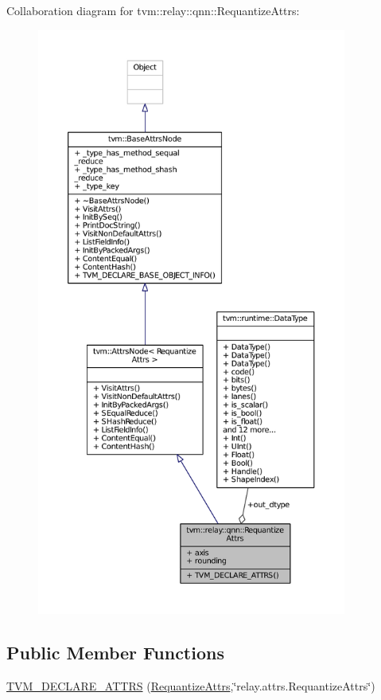 Collaboration diagram for tvm\+:\+:relay\+:\+:qnn\+:\+:Requantize\+Attrs\+:
\nopagebreak
\begin{figure}[H]
\begin{center}
\leavevmode
\includegraphics[height=550pt]{structtvm_1_1relay_1_1qnn_1_1RequantizeAttrs__coll__graph}
\end{center}
\end{figure}
\subsection*{Public Member Functions}
\begin{DoxyCompactItemize}
\item 
\hyperlink{structtvm_1_1relay_1_1qnn_1_1RequantizeAttrs_a8c68c859172c361c7bf5f517fc797833}{T\+V\+M\+\_\+\+D\+E\+C\+L\+A\+R\+E\+\_\+\+A\+T\+T\+RS} (\hyperlink{structtvm_1_1relay_1_1qnn_1_1RequantizeAttrs}{Requantize\+Attrs},\char`\"{}relay.\+attrs.\+Requantize\+Attrs\char`\"{})
\end{DoxyCompactItemize}
